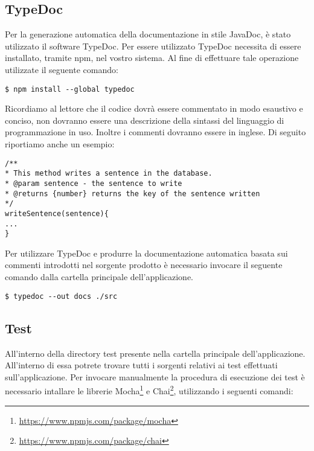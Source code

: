 \subsection{TypeDoc}
Per la generazione automatica della documentazione in stile JavaDoc, è stato utilizzato il software TypeDoc. 
Per essere utilizzato TypeDoc necessita di essere installato, tramite npm, nel vostro sistema. Al fine di effettuare tale operazione utilizzate il seguente comando:

\begin{center}
		\begin{minipage}{0.5\textwidth}
		\begin{lstlisting}[caption=Installazione di TypeDoc per la generazione della documentazione,numbers=none]
		$ npm install --global typedoc
			\end{lstlisting}		
		\end{minipage}
\end{center}

Ricordiamo al lettore che il codice dovrà essere commentato in modo esaustivo e conciso, non dovranno essere una descrizione della sintassi del linguaggio di programmazione in uso. Inoltre i commenti dovranno essere in inglese. Di seguito riportiamo anche un esempio:

\begin{lstlisting}[caption=Esempio di commento ad un metodo]
/**
* This method writes a sentence in the database.
* @param sentence - the sentence to write
* @returns {number} returns the key of the sentence written
*/
writeSentence(sentence){
...
}
\end{lstlisting}

Per utilizzare TypeDoc e produrre la documentazione automatica basata sui commenti introdotti nel sorgente prodotto è necessario invocare il seguente comando dalla cartella principale dell'applicazione.

\begin{center}
	\begin{minipage}{0.5\textwidth}
		\begin{lstlisting}[caption=Comandi per la generazione della documentazione,numbers=none]
			$ typedoc --out docs ./src
		\end{lstlisting}
	\end{minipage}
\end{center}
	
\subsection{Test}
All'interno della directory test presente nella cartella principale dell'applicazione. All'interno di essa potrete trovare tutti i sorgenti relativi ai test effettuati sull'applicazione.
Per invocare manualmente la procedura di esecuzione dei test è necessario intallare le librerie Mocha\footnote{\url{https://www.npmjs.com/package/mocha}} e Chai\footnote{\url{https://www.npmjs.com/package/chai}}, utilizzando i seguenti comandi:


